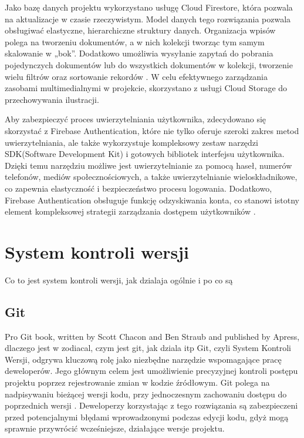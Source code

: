 Jako bazę danych projektu wykorzystano usługę Cloud Firestore, która pozwala na aktualizacje w czasie rzeczywistym. Model danych tego rozwiązania pozwala obsługiwać elastyczne, hierarchiczne struktury danych. Organizacja wpisów polega na tworzeniu dokumentów, a w nich kolekcji tworząc tym samym skalowanie w „bok”. Dodatkowo umożliwia wysyłanie zapytań do pobrania pojedynczych dokumentów lub do wszystkich dokumentów w kolekcji, tworzenie wielu filtrów oraz sortowanie rekordów \cite{storage}. W celu efektywnego zarządzania zasobami multimedialnymi w projekcie, skorzystano z usługi Cloud Storage do przechowywania ilustracji.

Aby zabezpieczyć proces uwierzytelniania użytkownika, zdecydowano się skorzystać z Firebase Authentication, które nie tylko oferuje szeroki zakres metod uwierzytelniania, ale także wykorzystuje kompleksowy zestaw narzędzi SDK(Software Development Kit) i gotowych bibliotek interfejsu użytkownika. Dzięki temu narzędziu możliwe jest uwierzytelnianie za pomocą haseł, numerów telefonów, mediów społecznościowych, a także uwierzytelnianie wieloskładnikowe, co zapewnia elastyczność i bezpieczeństwo procesu logowania. Dodatkowo, Firebase Authentication obsługuje funkcję odzyskiwania konta, co stanowi istotny element kompleksowej strategii zarządzania dostępem użytkowników \cite{authenticationase}.


\section*{\textbf{System kontroli wersji}}
Co to jest system kontroli wersji, jak dzialaja ogólnie i po co są
\subsection*{\textbf{Git}}
 Pro Git book, written by Scott Chacon and Ben Straub and published by Apress,
dlaczego jest w zodiacal, czym jest git, jak dziala itp
Git, czyli System Kontroli Wersji, odgrywa kluczową rolę jako niezbędne narzędzie
wspomagające pracę deweloperów. Jego głównym celem jest umożliwienie precyzyjnej
kontroli postępu projektu poprzez rejestrowanie zmian w kodzie źródłowym. Git polega na
nadpisywaniu bieżącej wersji kodu, przy jednoczesnym zachowaniu dostępu do poprzednich
wersji \cite{git}. Deweloperzy korzystając z tego rozwiązania są zabezpieczeni przed potencjalnymi błędami wprowadzonymi podczas edycji kodu, gdyż mogą sprawnie przywrócić wcześniejsze, działające wersje projektu.
